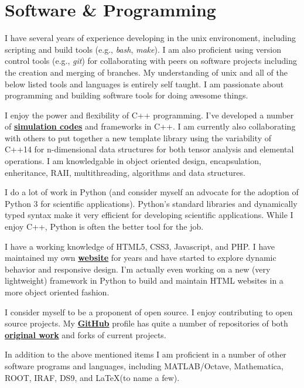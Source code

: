 

\section*{Software \& Programming}

\Descriptions
{
	\item[Unix >>] I have several years of experience developing in the unix environoment,
	including scripting and build tools (e.g., \textit{bash}, \textit{make}). I am also
	proficient using version control tools (e.g., \textit{git}) for collaborating with
	peers on software projects including the creation and merging of branches. My
	understanding of unix and all of the below listed tools and languages is entirely
	self taught. I am passionate about programming and building software tools for
	doing awesome things.

	\item[C++ >>] I enjoy the power and flexibility of C++ programming. I've developed a
	number of \href{http://github.com/glentner/Gaia-1.0}{\textbf{simulation codes}} and
	frameworks in C++. I am currently also collaborating with others to put together a
	new template library using the variability of C++14 for n-dimensional data structures
	for both tensor analysis and elemental operations. I am knowledgable in object oriented
	design, encapsulation, enheritance, RAII, multithreading, algorithms and data structures.

	\item[Python >>] I do a lot of work in Python (and consider myself an advocate for
	the adoption of Python 3 for scientific applications). Python's standard libraries
	and dynamically typed syntax make it very efficient for developing scientific
	applications. While I enjoy C++, Python is often the better tool for the job.

	\item[HTML >>] I have a working knowledge of HTML5, CSS3, Javascript, and PHP. I
	have maintained my own \href{http://glentner.github.io}{\textbf{website}} for years and
	have started to explore dynamic behavior and responsive design. I'm actually even
	working on a new (very lightweight) framework in Python to build and maintain HTML
	websites in a more object oriented fashion.

	\item[Open Source >>] I consider myself to be a proponent of open source. I enjoy
	contributing to open source projects. My \href{http://github.com/glentner}{\textbf{GitHub}}
	profile has quite a number of repositories of both
	\href{http://github.com/glentner/slipy}{\textbf{original work}} and forks of current projects.

	\item[Other Software >>] In addition to the above mentioned items I am proficient in
	a number of other software programs and languages, including MATLAB/Octave,
	Mathematica, ROOT, IRAF, DS9, and \LaTeX (to name a few).
}

\bigskip
